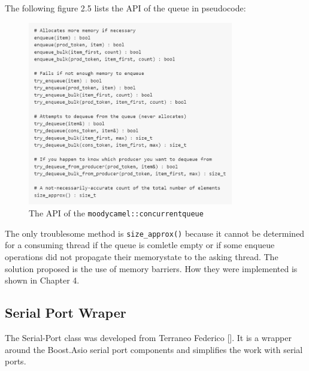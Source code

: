 The following figure 2.5 lists the API of the queue in pseudocode:

\begin{figure}[h]
\centering
      \includegraphics[width=0.8\textwidth]{moody}
        \caption{The API of the \texttt{moodycamel::concurrentqueue}}
\end{figure}

The only troublesome method is \texttt{size\_approx()} because it cannot be determined for a consuming thread if the queue is comletle empty or if some enqueue operations did not propagate their memorystate to the asking thread. The solution proposed is the use of memory barriers. How they were implemented is shown in Chapter 4.
\subsection{Serial Port Wraper}
The Serial-Port class was developed from Terraneo Federico []. It is a wrapper around the Boost.Asio serial port components and simplifies the work with serial ports. 